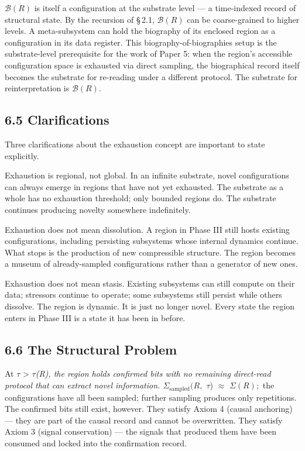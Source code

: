 \documentclass[11pt,oneside]{report}
\theoremstyle{definition}
\theoremstyle{remark}
\begin{document}
\ensuremath{\mathcal{B}(R)} is itself a configuration at the substrate level --- a time-indexed
record of structural state. By the recursion of \S\,2.1, \ensuremath{\mathcal{B}(R)} can be
coarse-grained to higher levels. A meta-subsystem can hold the biography
of its enclosed region as a configuration in its data register. This
biography-of-biographies setup is the substrate-level prerequisite for
the work of Paper 5: when the region's accessible configuration space is
exhausted via direct sampling, the biographical record itself becomes
the substrate for re-reading under a different protocol. The substrate
for reinterpretation is \ensuremath{\mathcal{B}(R).}

\subsection*{6.5 Clarifications}

Three clarifications about the exhaustion concept are important to state
explicitly.

Exhaustion is regional, not global. In an infinite substrate, novel
configurations can always emerge in regions that have not yet exhausted.
The substrate as a whole has no exhaustion threshold; only bounded
regions do. The substrate continues producing novelty somewhere
indefinitely.

Exhaustion does not mean dissolution. A region in Phase III still hosts
existing configurations, including persisting subsystems whose internal
dynamics continue. What stops is the production of new compressible
structure. The region becomes a museum of already-sampled configurations
rather than a generator of new ones.

Exhaustion does not mean stasis. Existing subsystems can still compute
on their data; stressors continue to operate; some subsystems still
persist while others dissolve. The region is dynamic. It is just no
longer novel. Every state the region enters in Phase III is a state it
has been in before.

\subsection*{6.6 The Structural Problem}

At \ensuremath{\tau} \textgreater{} \ensuremath{\tau}\emph{(R), the region holds confirmed bits with no
remaining direct-read protocol that can extract novel information.
\ensuremath{\Sigma_{\mathrm{sampled}}(R,} \ensuremath{\tau}}) \ensuremath{\approx} \ensuremath{\Sigma (R);} the configurations have all been sampled;
further sampling produces only repetitions. The confirmed bits still
exist, however. They satisfy Axiom 4 (causal anchoring) --- they are
part of the causal record and cannot be overwritten. They satisfy Axiom
3 (signal conservation) --- the signals that produced them have been
consumed and locked into the confirmation record.
\end{document}
